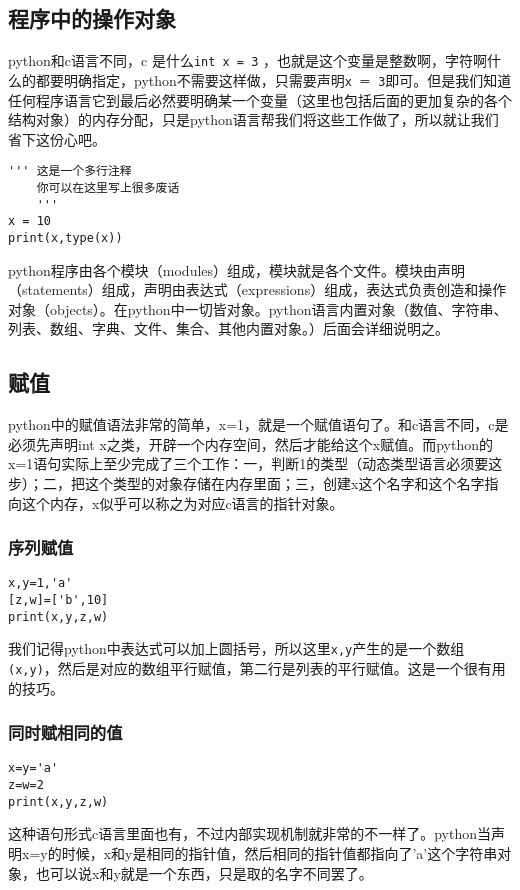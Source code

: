 \documentclass[12pt,oneside]{book}
\begin{document}
\begin{common-format}
\chapter{程序中的操作对象}
python和c语言不同，c 是什么\verb+int x = 3+ ，也就是这个变量是整数啊，字符啊什么的都要明确指定，python不需要这样做，只需要声明\verb+x ＝ 3+即可。但是我们知道任何程序语言它到最后必然要明确某一个变量（这里也包括后面的更加复杂的各个结构对象）的内存分配，只是python语言帮我们将这些工作做了，所以就让我们省下这份心吧。

\begin{Verbatim}
''' 这是一个多行注释
    你可以在这里写上很多废话
    '''
x = 10
print(x,type(x))
\end{Verbatim}

python程序由各个模块（modules）组成，模块就是各个文件。模块由声明（statements）组成，声明由表达式（expressions）组成，表达式负责创造和操作对象（objects）。在python中一切皆对象。python语言内置对象（数值、字符串、列表、数组、字典、文件、集合、其他内置对象。）后面会详细说明之。


\section{赋值}
python中的赋值语法非常的简单，x=1，就是一个赋值语句了。和c语言不同，c是必须先声明int x之类，开辟一个内存空间，然后才能给这个x赋值。而python的x=1语句实际上至少完成了三个工作：一，判断1的类型（动态类型语言必须要这步）；二，把这个类型的对象存储在内存里面；三，创建x这个名字和这个名字指向这个内存，x似乎可以称之为对应c语言的指针对象。

\subsection{序列赋值}
\begin{Verbatim}
x,y=1,'a'
[z,w]=['b',10]
print(x,y,z,w)
\end{Verbatim}

我们记得python中表达式可以加上圆括号，所以这里\verb+x,y+产生的是一个数组\verb+(x,y)+，然后是对应的数组平行赋值，第二行是列表的平行赋值。这是一个很有用的技巧。

\subsection{同时赋相同的值}
\begin{Verbatim}
x=y='a'
z=w=2
print(x,y,z,w)
\end{Verbatim}
这种语句形式c语言里面也有，不过内部实现机制就非常的不一样了。python当声明x=y的时候，x和y是相同的指针值，然后相同的指针值都指向了'a'这个字符串对象，也可以说x和y就是一个东西，只是取的名字不同罢了。


\end{common-format}
\end{document}
